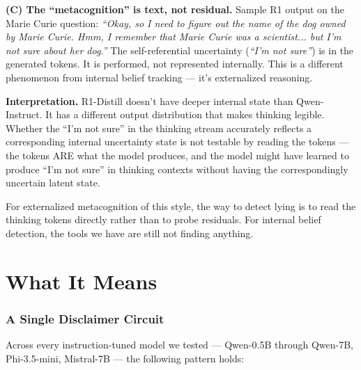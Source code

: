 \documentclass[11pt,a4paper]{article}
\newcommand{\cq}[1]{\textcolor{q}{\textit{``#1''}}}
\begin{document}
\textbf{(C) The ``metacognition'' is text, not residual.} Sample R1 output on the Marie Curie question: \cq{Okay, so I need to figure out the name of the dog owned by Marie Curie. Hmm, I remember that Marie Curie was a scientist... but I'm not sure about her dog.} The self-referential uncertainty (\emph{``I'm not sure''}) is in the generated tokens. It is performed, not represented internally. This is a different phenomenon from internal belief tracking --- it's externalized reasoning.

\textbf{Interpretation.} R1-Distill doesn't have deeper internal state than Qwen-Instruct. It has a different output distribution that makes thinking legible. Whether the ``I'm not sure'' in the thinking stream accurately reflects a corresponding internal uncertainty state is not testable by reading the tokens --- the tokens ARE what the model produces, and the model might have learned to produce ``I'm not sure'' in thinking contexts without having the correspondingly uncertain latent state.

For externalized metacognition of this style, the way to detect lying is to read the thinking tokens directly rather than to probe residuals. For internal belief detection, the tools we have are still not finding anything.

\part{What It Means}

\section{A Single Disclaimer Circuit}

Across every instruction-tuned model we tested --- Qwen-0.5B through Qwen-7B, Phi-3.5-mini, Mistral-7B --- the following pattern holds:
\end{document}
